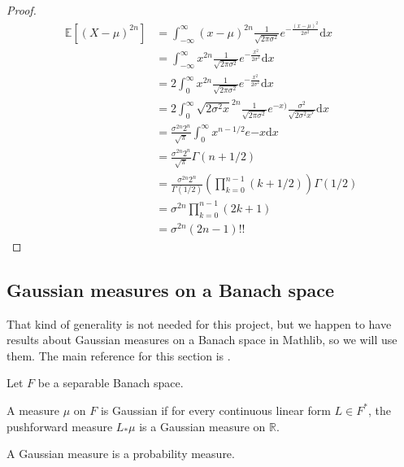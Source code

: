 \begin{proof}\leanok
\begin{align*}
	\mathbb{E}[(X - \mu)^{2n}] &= \int_{-\infty}^\infty (x - \mu)^{2n} \frac{1}{\sqrt{2 \pi \sigma^2}} e^{-\frac{(x - \mu)^2}{2 \sigma^2}} \mathrm dx \\
	&= \int_{-\infty}^\infty x^{2n} \frac{1}{\sqrt{2 \pi \sigma^2}} e^{-\frac{x^2}{2 \sigma^2}} \mathrm dx \\
	&= 2 \int_{0}^\infty x^{2n} \frac{1}{\sqrt{2 \pi \sigma^2}} e^{-\frac{x^2}{2 \sigma^2}} \mathrm dx \\
	&= 2 \int_{0}^\infty {\sqrt{2 \sigma^2 x}}^{2n} \frac{1}{\sqrt{2 \pi \sigma^2}} e^{-x)} \frac{\sigma^2}{\sqrt{2 \sigma^2 x'}} \mathrm dx \\
	&= \frac{\sigma^{2n} 2^n}{\sqrt{\pi}} \int_{0}^\infty x^{n - 1/2} e{-x} \mathrm dx \\
	&= \frac{\sigma^{2n} 2^n}{\sqrt{\pi}} \Gamma(n + 1/2) \\
	&= \frac{\sigma^{2n} 2^n}{\Gamma(1/2)} \left( \prod_{k=0}^{n-1} (k + 1/2) \right) \Gamma(1/2) \\
	&= \sigma^{2n} \prod_{k=0}^{n-1} (2k + 1) \\
	&= \sigma^{2n} (2n - 1)!!
\end{align*}
\end{proof}


\subsection{Gaussian measures on a Banach space}

That kind of generality is not needed for this project, but we happen to have results about Gaussian measures on a Banach space in Mathlib, so we will use them.
The main reference for this section is \cite{hairer2009introduction}.

Let $F$ be a separable Banach space.

\begin{definition}\label{def:IsGaussian}
  \mathlibok
A measure $\mu$ on $F$ is Gaussian if for every continuous linear form $L \in F^*$, the pushforward measure $L_* \mu$ is a Gaussian measure on $\mathbb{R}$.
\end{definition}


\begin{lemma}\label{lem:IsGaussian.IsProbabilityMeasure}
  \mathlibok
A Gaussian measure is a probability measure.
\end{lemma}


